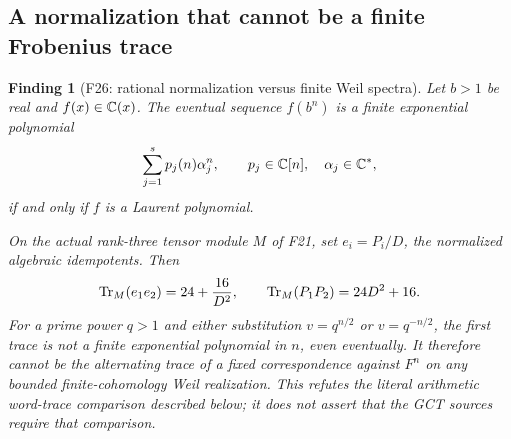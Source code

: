 \documentclass[11pt,a4paper]{article}
\newcommand{\fid}[1]{\textsf{#1}}\newcommand{\gate}[1]{\textsf{#1}}
\theoremstyle{named}\newtheorem{finding}{Finding}[section]
\theoremstyle{definition}\newtheorem{definition}[finding]{Definition}
\theoremstyle{remark}\newtheorem{remark}[finding]{Remark}
\begin{document}
\subsection{A normalization that cannot be a finite Frobenius trace}
\begin{finding}[\fid{F26}: rational normalization versus finite Weil spectra]\label{f:normalizedtrace}
Let $b>1$ be real and $f(x)\in\mathbb C(x)$. The eventual sequence $f(b^n)$ is
a finite exponential polynomial
\[
 \sum_{j=1}^s p_j(n)\alpha_j^n,
 \qquad p_j\in\mathbb C[n],\quad \alpha_j\in\mathbb C^*,
\]
if and only if $f$ is a Laurent polynomial.

On the \emph{actual} rank-three tensor module $M$ of \fid{F21}, set
$e_i=P_i/D$, the normalized algebraic idempotents. Then
\[
 \operatorname{Tr}_M(e_1e_2)=24+\frac{16}{D^2},\qquad
 \operatorname{Tr}_M(P_1P_2)=24D^2+16.
\]
For a prime power $q>1$ and either substitution $v=q^{n/2}$ or $v=q^{-n/2}$, the first trace
is not a finite exponential polynomial in $n$, even eventually.
It therefore cannot be the alternating trace of a fixed correspondence
against $F^n$ on any bounded finite-cohomology Weil realization.
This refutes the literal arithmetic word-trace comparison described
below; it does not assert that the GCT sources require that comparison.
\end{finding}
\end{document}
